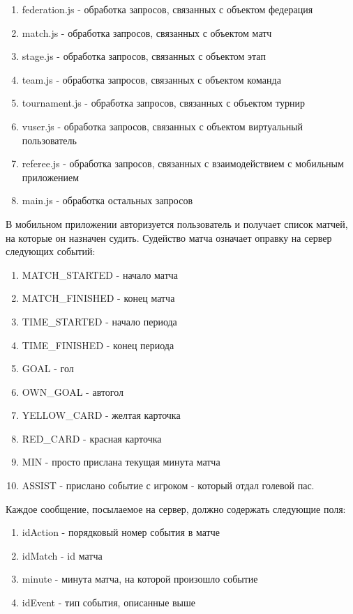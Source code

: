 \begin{enumerate}
	\item federation.js - обработка запросов, связанных с объектом федерация
	\item match.js - обработка запросов, связанных с объектом матч
	\item stage.js - обработка запросов, связанных с объектом этап
	\item team.js - обработка запросов, связанных с объектом команда
	\item tournament.js - обработка запросов, связанных с объектом турнир
	\item vuser.js - обработка запросов, связанных с объектом виртуальный пользователь
	\item referee.js - обработка запросов, связанных с взаимодействием с мобильным приложением
	\item main.js - обработка остальных запросов 
\end{enumerate}

В мобильном приложении авторизуется пользователь и получает список матчей, на которые он назначен судить. Судейство матча означает оправку на сервер следующих событий:
\begin{enumerate}
	\item MATCH\_STARTED - начало матча
	\item MATCH\_FINISHED - конец матча
	\item TIME\_STARTED - начало периода
	\item TIME\_FINISHED - конец периода
	\item GOAL - гол
	\item OWN\_GOAL - автогол
	\item YELLOW\_CARD - желтая карточка
	\item RED\_CARD - красная карточка
	\item MIN - просто прислана текущая минута матча
	\item ASSIST - прислано событие с игроком - который отдал голевой пас.
\end{enumerate}

Каждое сообщение, посылаемое на сервер, должно содержать следующие поля:
 \begin{enumerate}
	\item idAction - порядковый номер события в матче 
	\item idMatch - id матча 
	\item minute - минута матча, на которой произошло событие
	\item idEvent - тип события, описанные выше
\end{enumerate}

